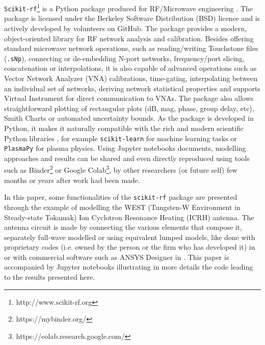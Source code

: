 \documentclass[%
aip,
cp,  %
amsmath,amssymb,%
reprint,%
]{revtex4-2}
\begin{document}
	\texttt{Scikit-rf}\footnote{http://www.scikit-rf.org} is a Python package produced for RF/Microwave engineering  \cite{Arsenovic2018}. The package is licensed under the Berkeley Software Distribution (BSD) licence and is actively developed by volunteers on GitHub. The package provides a modern, object-oriented library for RF network analysis and calibration. Besides offering standard microwave network operations, such as reading/writing Touchstone files (\texttt{.sNp}), connecting or de-embedding N-port networks, frequency/port slicing, concatenation or interpolations, it is also capable of advanced operations such as Vector Network Analyzer (VNA) calibrations, time-gating, interpolating between an individual set of networks, deriving network statistical properties and supports Virtual Instrument for direct communication to VNAs. The package also allows straightforward plotting of rectangular plots (dB, mag, phase, group delay, etc), Smith Charts or automated uncertainty bounds. As the package is developed in Python, it makes it naturally compatible with the rich and modern scientific Python libraries \cite{Millman2011}, for example  \texttt{scikit-learn} for machine learning tasks \cite{scikit-learn} or \texttt{PlasmaPy} \cite{PlasmaPyCommunity2018} for plasma physics. Using Jupyter notebooks documents\cite{Kluyver2016}, modelling approaches and results can be shared and even directly reproduced using tools such as Binder\footnote{https://mybinder.org/}\cite{project-jupyter-proc-scipy-2018} or Google Colab\footnote{https://colab.research.google.com/}, by other researchers (or future self) few months or years after work had been made.
	
	In this paper, some functionalities of the \texttt{scikit-rf} package are presented through the example of modelling the WEST (Tungsten-W Environment in Steady-state Tokamak) Ion Cyclotron Resonance Heating (ICRH) antenna. The antenna circuit is made by connecting the various elements that compose it, separately full-wave modelled or using equivalent lumped models, like done with proprietary codes (i.e. owned by the person or the firm who has developed it)  in \cite{Durodie2015, Helou2015SIDON} or with commercial software such as ANSYS Designer in \cite{Hillairet2015}. This paper is accompanied by Jupyter notebooks illustrating in more details the code leading to the results presented here\cite{Hillairet2019zenodo}.
	
	
\end{document}
